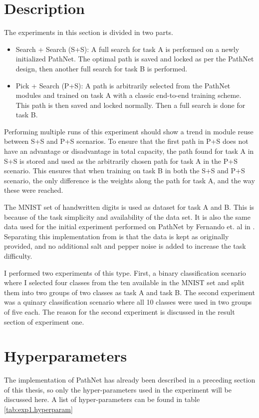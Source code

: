 \section{Description}
The experiments in this section is divided in two parts. 
\begin{itemize}
    \item Search + Search (S+S): A full search for task A is performed on a newly initialized PathNet. The optimal path is saved and locked as per the PathNet design, then another full search for task B is performed.
    \item Pick + Search (P+S): A path is arbitrarily selected from the PathNet modules and trained on task A with a classic end-to-end training scheme. This path is then saved and locked normally. Then a full search is done for task B.
\end{itemize}
Performing multiple runs of this experiment should show a trend in module reuse between S+S and P+S scenarios. To ensure that the first path in P+S does not have an advantage or disadvantage in total capacity,  the path found for task A in S+S is stored and used as the arbitrarily chosen path for task A in the P+S scenario. This ensures that when training on task B in both the S+S and P+S scenario, the only difference is the weights along the path for task A, and the way these were reached. 

The MNIST set of handwritten digits is used as dataset for task A and B. This is because of the task simplicity and availability of the data set. 
It is also the same data used for the initial experiment performed on PathNet by Fernando et. al in \cite{pathnet}. Separating this implementation from \cite{pathnet} is that the data is kept as originally provided, and no additional salt and pepper noise is added to increase the task difficulty. 


I performed two experiments of this type. First, a binary classification scenario where I selected four classes from the ten available in the MNIST set and split them into two groups of two classes as task A and task B. The second experiment was a quinary classification scenario where all 10 classes were used in two groups of five each. The reason for the second experiment is discussed in the result section of experiment one. 

\section{Hyperparameters}
\label{exp1:implementation}
The implementation of PathNet has already been described in a preceding section of this thesis, so only the hyper-parameters used in the experiment will be discussed here. A list of hyper-parameters can be found in table \ref{tab:exp1.hyperparam}

